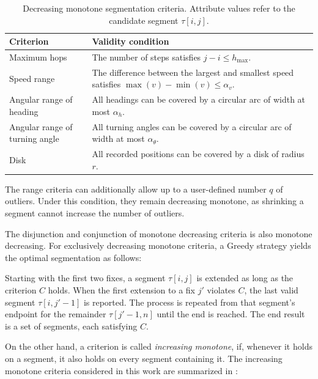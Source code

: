 \begin{table}[htbp]
    \centering
    \caption{Decreasing monotone segmentation criteria.
    Attribute values refer to the candidate segment
    $\tau[i,j]$.}
    \label{tab:decreasing-criteria}
    \begin{tabularx}{\textwidth}{@{}lX@{}}
        \toprule
        Criterion & Validity condition \\
        \midrule

        Maximum hops &
        The number of steps satisfies $j-i\leq h_{\max}$.
        \\[0.5em]

        Speed range &
        The difference between the largest and smallest
        speed satisfies $\max(v)-\min(v)\leq\alpha_v$.
        \\[0.5em]

        Angular range of heading &
        All headings can be covered by a circular arc
        of width at most $\alpha_h$.
        \\[0.5em]

        Angular range of turning angle &
        All turning angles can be covered by a circular
        arc of width at most $\alpha_\theta$.
        \\[0.5em]

        Disk &
        All recorded positions can be covered by a disk
        of radius $r$.
        \\

        \bottomrule
    \end{tabularx}
\end{table}
The range criteria can additionally allow up to a user-defined number $q$ of outliers.
Under this condition, they remain decreasing monotone, as shrinking a segment cannot increase the number of outliers.

The disjunction and conjunction of monotone decreasing criteria is also monotone decreasing.
For exclusively decreasing monotone criteria, a Greedy strategy yields the optimal segmentation as follows:

Starting with the first two fixes, a segment $\tau[i, j]$ is extended as long as the criterion $C$ holds.
When the first extension to a fix $j'$ violates $C$, the last valid segment $\tau[i,j'-1]$ is reported.
The process is repeated from that segment's endpoint for the remainder $\tau[j'-1,n]$ until the end is reached.
The end result is a set of segments, each satisfying $C$.

On the other hand, a criterion is called \emph{increasing monotone}, if, whenever it holds on a segment, it also holds on every segment containing it.
The increasing monotone criteria considered in this work are summarized in :

